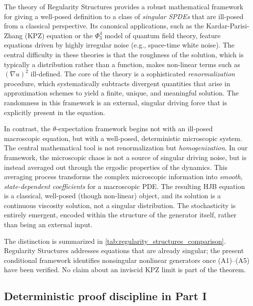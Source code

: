 \documentclass[12pt, letterpaper]{amsart}
\newcommand{\ThetaExpectation}{$\theta$-expectation}
\theoremstyle{plain}
\theoremstyle{definition}
\theoremstyle{remark}
\begin{document}
The theory of Regularity Structures provides a robust mathematical framework for giving a well-posed definition to a class of \textit{singular SPDEs} that are ill-posed from a classical perspective. Its canonical applications, such as the Kardar-Parisi-Zhang (KPZ) equation or the $\Phi^4_3$ model of quantum field theory, feature equations driven by highly irregular noise (e.g., space-time white noise). The central difficulty in these theories is that the roughness of the solution, which is typically a distribution rather than a function, makes non-linear terms such as $(\nabla u)^2$ ill-defined. The core of the theory is a sophisticated \textit{renormalization} procedure, which systematically subtracts divergent quantities that arise in approximation schemes to yield a finite, unique, and meaningful solution. The randomness in this framework is an external, singular driving force that is explicitly present in the equation.

In contrast, the \ThetaExpectation{} framework begins not with an ill-posed macroscopic equation, but with a well-posed, deterministic microscopic system. The central mathematical tool is not renormalization but \textit{homogenization}. In our framework, the microscopic chaos is not a source of singular driving noise, but is instead averaged out through the ergodic properties of the dynamics. This averaging process transforms the complex microscopic information into \textit{smooth, state-dependent coefficients} for a macroscopic PDE. The resulting HJB equation is a classical, well-posed (though non-linear) object, and its solution is a continuous viscosity solution, not a singular distribution. The stochasticity is entirely emergent, encoded within the structure of the generator itself, rather than being an external input.

The distinction is summarized in \cref{tab:regularity_structures_comparison}.
Regularity Structures addresses equations that are already singular; the
present conditional framework identifies nonsingular nonlinear generators once
\textup{(A1)--(A5)} have been verified. No claim about an inviscid KPZ limit is
part of the theorem.




\subsection{Deterministic proof discipline in Part I}
\label{subsec:deterministic_proof_discipline}
\end{document}
